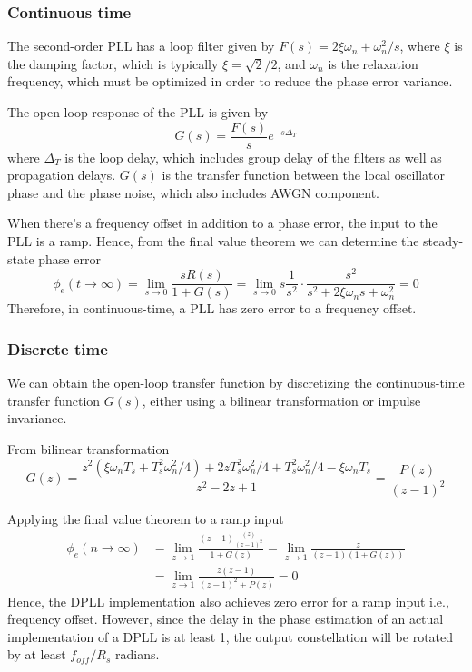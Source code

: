 \documentclass[a4paper]{article}
\begin{document}
\subsubsection{Continuous time}

The second-order PLL has a loop filter given by $F(s) = 2\xi\omega_n + \omega_n^2/s$, where $\xi$ is the damping factor, which is typically $\xi = \sqrt{2}/2$, and $\omega_n$ is the relaxation frequency, which must be optimized in order to reduce the phase error variance.

The open-loop response of the PLL is given by
\begin{equation}
G(s) = \frac{F(s)}{s}e^{-s\Delta_T}
\end{equation}
where $\Delta_T$ is the loop delay, which includes group delay of the filters as well as propagation delays. $G(s)$ is the transfer function between the local oscillator phase and the phase noise, which also includes AWGN component. 

When there's a frequency offset in addition to a phase error, the input to the PLL is a ramp. Hence, from the final value theorem we can determine the steady-state phase error
\begin{equation}
\phi_e(t\to\infty) = \lim_{s\to 0} \frac{sR(s)}{1 + G(s)} = \lim_{s\to 0}s\frac{1}{s^2}\cdot\frac{s^2}{s^2 + 2\xi\omega_ns + \omega_n^2} = 0
\end{equation}
Therefore, in continuous-time, a PLL has zero error to a frequency offset.

\subsubsection{Discrete time}

We can obtain the open-loop transfer function by discretizing the continuous-time transfer function $G(s)$, either using a bilinear transformation or impulse invariance.

From bilinear transformation
\begin{equation}
G(z) = \frac{z^2(\xi\omega_nT_s + T_s^2\omega_n^2/4) + 2zT_s^2\omega_n^2/4 + T_s^2\omega_n^2/4 - \xi\omega_nT_s}{z^2 - 2z + 1} = \frac{P(z)}{(z-1)^2}
\end{equation}

Applying the final value theorem to a ramp input
\begin{align} \nonumber
\phi_e(n\to\infty) &= \lim_{z\to 1} \frac{(z-1)\frac{(z)}{(z-1)^2}}{1 + G(z)} = \lim_{z\to 1} \frac{z}{(z-1)(1 + G(z))} \\
&= \lim_{z\to 1} \frac{z(z-1)}{(z-1)^2 + P(z)} = 0
\end{align}
Hence, the DPLL implementation also achieves zero error for a ramp input i.e., frequency offset. However, since the delay in the phase estimation of an actual implementation of a DPLL is at least 1, the output constellation will be rotated by at least $f_{off}/R_s$ radians.
\end{document}
